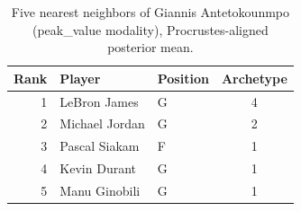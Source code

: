 \begin{table}[htbp]
  \centering\small
  \begin{tabular}{rllc}
    \toprule
    Rank & Player & Position & Archetype \\
    \midrule
    1 & LeBron James & G & 4 \\
    2 & Michael Jordan & G & 2 \\
    3 & Pascal Siakam & F & 1 \\
    4 & Kevin Durant & G & 1 \\
    5 & Manu Ginobili & G & 1 \\
    \bottomrule
  \end{tabular}
  \caption{Five nearest neighbors of Giannis Antetokounmpo (peak_value modality), Procrustes-aligned posterior mean.}
  \label{tab:Giannis_Antetokounmpo_neighbors_peak_value}
\end{table}

